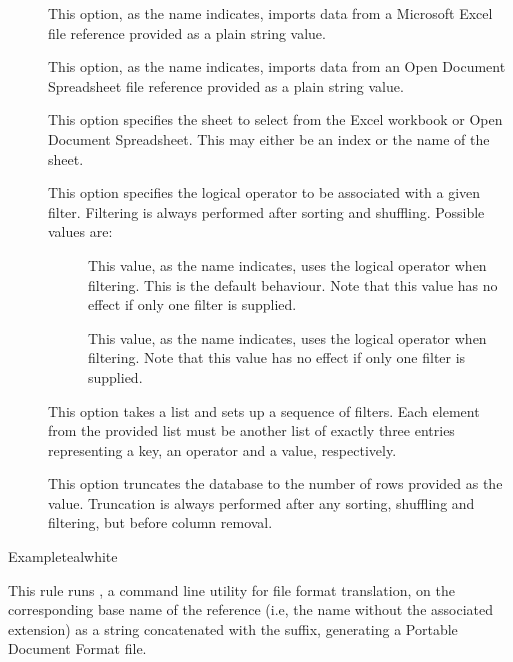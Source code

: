 \begin{description}
\begin{description}
\item[] This option, as the name indicates, imports data from a Microsoft Excel  file reference provided as a plain string value.

\item[] This option, as the name indicates, imports data from an Open Document Spreadsheet  file reference provided as a plain string value.

\item[] This option specifies the sheet to select from the Excel workbook or Open Document Spreadsheet. This may either be an index or the name of the sheet.

\item[] This option specifies the logical operator to be associated with a given filter. Filtering is always performed after sorting and shuffling. Possible values are:

\begin{description}
\item[\hfill\hphantom{w}] This value, as the name indicates, uses the logical  operator when filtering. This is the default behaviour. Note that this value has no effect if only one filter is supplied.

\item[] This value, as the name indicates, uses the logical  operator when filtering. Note that this value has no effect if only one filter is supplied.
\end{description}

\item[] This option takes a list and sets up a sequence of filters. Each element from the provided list must be another list of exactly three entries representing a key, an operator and a value, respectively.

\item[] This option truncates the database to the number of rows provided as the value. Truncation is always performed after any sorting, shuffling and filtering, but before column removal.
\end{description}

\begin{codebox}{Example}{teal}{\icnote}{white}
\end{codebox}

\item[\rulebox{dvipdfm}{Marco Daniel, Paulo Cereda}] This rule runs , a command line utility for file format translation, on the corresponding base name of the  reference (i.e, the name without the associated extension) as a string concatenated with the  suffix, generating a Portable Document Format  file.


\end{description}
